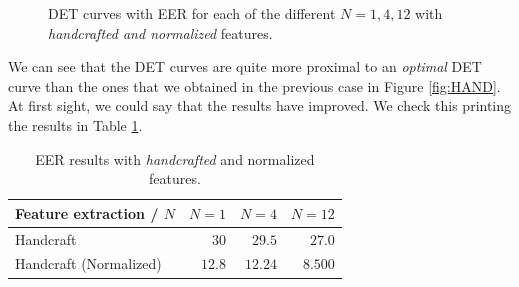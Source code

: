 \documentclass[a4paper]{article}
\begin{document}
{\begin{figure}[H]
  \centering
  \qquad
  \qquad%
  \caption{DET curves with EER for each of the different \(N = 1,4,12\) with \emph{handcrafted and normalized} features.}
  \label{fig:NORM}
\end{figure}


We can see that the DET curves are quite more proximal to an \emph{optimal} DET curve than the ones that we obtained in the previous case in Figure \ref{fig:HAND}. At first sight, we could say that the results have improved. We check this printing the results in Table \ref{table:res:NORM}.

\begin{table}[H]
  \centering
\begin{tabular}{l|rrr}
Feature extraction / $N$ & $N = 1$ & $N=4$  & $N = 12$ \\ \hline
Handcraft                & $30$    & $29.5$ & $27.0$  \\
Handcraft (Normalized) & $12.8$ & $12.24$ & $\mathbf{8.500}$
\end{tabular}
\caption{EER results with \emph{handcrafted} and normalized features.}
\label{table:res:NORM}
\end{table}

}
\end{document}
